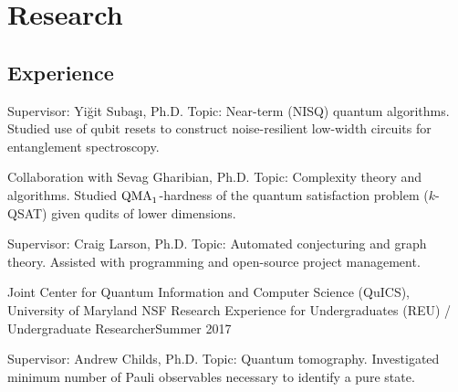 \documentclass[11pt,letterpaper,serif]{moderncv}
\begin{document}
\section{Research}
\subsection{Experience}
{
	\begin{adjustwidth}{.25in}{}		
		Supervisor: Yi\u{g}it Suba\c{s}\i, Ph.D. \newline
		Topic: Near-term (NISQ) quantum algorithms. Studied use of qubit resets to construct noise-resilient low-width circuits for entanglement spectroscopy.
	\end{adjustwidth}
}

{	
	\begin{adjustwidth}{.25in}{}
		Collaboration with Sevag Gharibian, Ph.D. \newline
		Topic: Complexity theory and algorithms. Studied $\textup{QMA}_{1}$-hardness of the quantum satisfaction problem ($k$-QSAT) given qudits of lower dimensions.
	\end{adjustwidth}
}

{	
	\begin{adjustwidth}{.25in}{}
		Supervisor: Craig Larson, Ph.D. \newline
		Topic: Automated conjecturing and graph theory. Assisted with programming and open-source project management.
	\end{adjustwidth}
}

\cventry{}
{\small Joint Center for Quantum Information and Computer Science (QuICS), University of Maryland}
{NSF Research Experience for Undergraduates (REU) / Undergraduate Researcher}{Summer 2017}{}
{	
	\begin{adjustwidth}{.25in}{}
		Supervisor: Andrew Childs, Ph.D. \newline
		Topic: Quantum tomography. Investigated minimum number of Pauli observables necessary to identify a pure state. %
	\end{adjustwidth}
}
\end{document}
